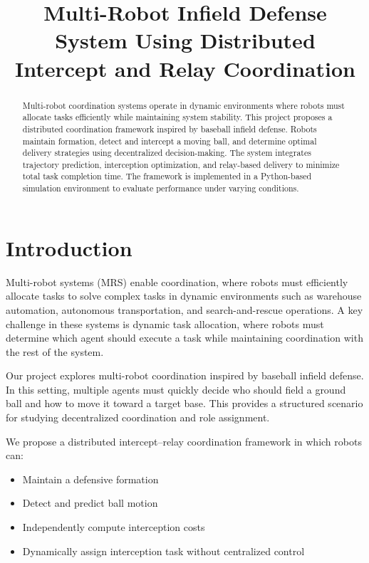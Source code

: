 \documentclass[conference]{IEEEtran}
\title{Multi-Robot Infield Defense System Using Distributed Intercept and Relay Coordination}
\author{
\IEEEauthorblockN{Aman Khatri, Dena Shink, Jason Ballinger}
\IEEEauthorblockA{Indiana University Bloomington}
}
\begin{document}
\maketitle

\begin{abstract}
Multi-robot coordination systems operate in dynamic environments where robots must allocate tasks efficiently while maintaining system stability. This project proposes a distributed coordination framework inspired by baseball infield defense. Robots maintain formation, detect and intercept a moving ball, and determine optimal delivery strategies using decentralized decision-making. The system integrates trajectory prediction, interception optimization, and relay-based delivery to minimize total task completion time. The framework is implemented in a Python-based simulation environment to evaluate performance under varying conditions.
\end{abstract}

\section{Introduction}

Multi-robot systems (MRS) enable coordination, where robots must efficiently allocate tasks to solve complex tasks in dynamic environments such as warehouse automation, autonomous transportation, and search-and-rescue operations. A key challenge in these systems is dynamic task allocation, where robots must determine which agent should execute a task while maintaining coordination with the rest of the system.

Our project explores multi-robot coordination inspired by baseball infield defense. In this setting, multiple agents must quickly decide who should field a ground ball and how to move it toward a target base. This provides a structured scenario for studying decentralized coordination and role assignment.

We propose a distributed intercept–relay coordination framework in which robots can:
\begin{itemize}
    \item Maintain a defensive formation
    \item Detect and predict ball motion
    \item Independently compute interception costs
    \item Dynamically assign interception task without centralized control
\end{itemize}
\end{document}

